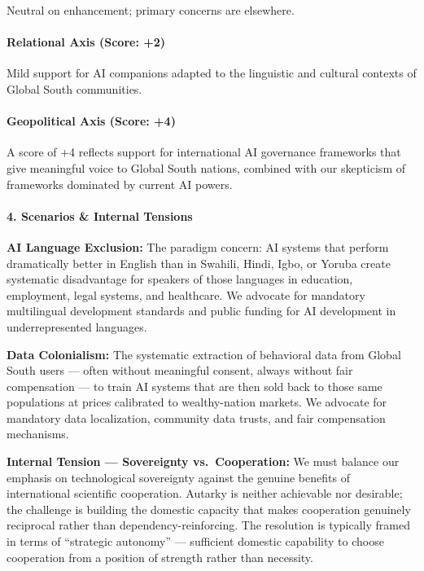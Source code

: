 Neutral on enhancement; primary concerns are elsewhere.

\paragraph{Relational Axis (Score: +2)}\label{relational-axis-score-2-7}

Mild support for AI companions adapted to the linguistic and cultural
contexts of Global South communities.

\paragraph{Geopolitical Axis (Score:
+4)}\label{geopolitical-axis-score-4}

A score of +4 reflects support for international AI governance
frameworks that give meaningful voice to Global South nations, combined
with our skepticism of frameworks dominated by current AI powers.

\paragraph{4. Scenarios \& Internal
Tensions}\label{scenarios-internal-tensions-44}

\textbf{AI Language Exclusion:} The paradigm concern: AI systems that
perform dramatically better in English than in Swahili, Hindi, Igbo, or
Yoruba create systematic disadvantage for speakers of those languages in
education, employment, legal systems, and healthcare. We advocate for
mandatory multilingual development standards and public funding for AI
development in underrepresented languages.

\textbf{Data Colonialism:} The systematic extraction of behavioral data
from Global South users --- often without meaningful consent, always
without fair compensation --- to train AI systems that are then sold
back to those same populations at prices calibrated to wealthy-nation
markets. We advocate for mandatory data localization, community data
trusts, and fair compensation mechanisms.

\textbf{Internal Tension --- Sovereignty vs.~Cooperation:} We must
balance our emphasis on technological sovereignty against the genuine
benefits of international scientific cooperation. Autarky is neither
achievable nor desirable; the challenge is building the domestic
capacity that makes cooperation genuinely reciprocal rather than
dependency-reinforcing. The resolution is typically framed in terms of
``strategic autonomy'' --- sufficient domestic capability to choose
cooperation from a position of strength rather than necessity.

